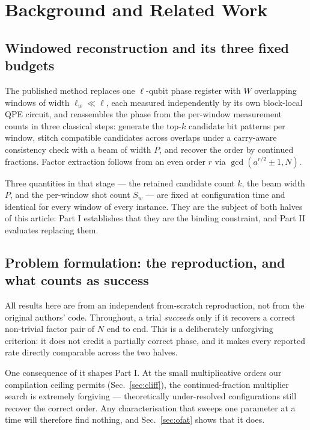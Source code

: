 \section{Background and Related Work}
\label{sec:pipeline}

\subsection{Windowed reconstruction and its three fixed budgets}

The published method \cite{wqpe2025,modularshor2025} replaces one
$\ell$-qubit phase register with $W$ overlapping windows of width
$\ell_w\ll\ell$, each measured independently by its own block-local QPE
circuit, and reassembles the phase from the per-window measurement counts in
three classical steps: generate the top-$k$ candidate bit patterns per
window, stitch compatible candidates across overlaps under a carry-aware
consistency check with a beam of width $P$, and recover the order by
continued fractions. Factor extraction follows from an even order $r$ via
$\gcd(a^{r/2}\pm1,N)$.

Three quantities in that stage --- the retained candidate count $k$, the beam
width $P$, and the per-window shot count $S_w$ --- are fixed at configuration
time and identical for every window of every instance. They are the subject
of both halves of this article: Part I establishes that they are the binding
constraint, and Part II evaluates replacing them.

\subsection{Problem formulation: the reproduction, and what counts as success}

All results here are from an independent from-scratch reproduction, not from
the original authors' code. Throughout, a trial \emph{succeeds} only if it
recovers a correct non-trivial factor pair of $N$ end to end. This is a
deliberately unforgiving criterion: it does not credit a partially correct
phase, and it makes every reported rate directly comparable across the two
halves.

One consequence of it shapes Part I. At the small multiplicative orders our
compilation ceiling permits (Sec.~\ref{sec:cliff}), the continued-fraction
multiplier search is extremely forgiving --- theoretically under-resolved
configurations still recover the correct order. Any characterisation that
sweeps one parameter at a time will therefore find nothing, and
Sec.~\ref{sec:ofat} shows that it does.

